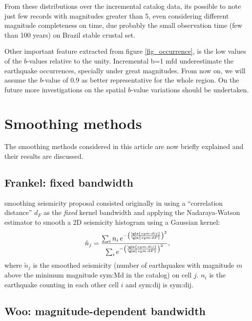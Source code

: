 \documentclass[draft, grl]{agutex}
\begin{document}
\begin{article}
From these distributions over the incremental catalog data, its possible to note just few records with magnitudes greater than 5, even considering different magnitude completeness on time, due probably the small observation time (few than 100 years) on Brazil stable crustal set.

Other important feature extracted from figure \ref{fig_occurrence}, is the low values of the $b$-values relative to the unity. Incremental b=1 \gls{mfd} underestimate the earthquake occurrences, specially under great magnitudes. From now on, we will assume the $b$-value of 0.9 as better representative for the whole region. On the future more investigations on the spatial $b$-value variations should be undertaken.

%
%
\section{Smoothing methods}
The smoothing methods considered in this article are now briefly explained and their results are discussed.

\subsection{Frankel: fixed bandwidth}

\citet{frankel_1995} smoothing seismicity proposal consisted originally in using a ``correlation distance'' $d_F$ as the \textit{fixed} kernel bandwidth and applying the Nadaraya-Watson \citep{nadaraya_1964, watson_1964} estimator to smooth a 2D seismicity histogram using a Gaussian kernel:
\begin{equation}
	\ensuremath{
		\tilde{n}_j = \frac{ \sum_{i} n_i \,e^{ - \left(\frac{\gls{sym:dij}}{\gls{sym:dF}}\right)^2}}
						   { \sum_{i}     e^{ - \left(\frac{\gls{sym:dij}}{\gls{sym:dF}}\right)^2}},
	}
	\label{eq:ni}
\end{equation}
where $\tilde{n}_j$ is the smoothed seismicity (number of earthquakes with magnitude $m$ above the minimum magnitude \gls{sym:Md} in the catalog) on cell $j$. $n_i$ is the earthquake counting in each other cell $i$ and \gls{sym:dij} is \glsdesc{sym:dij}.



\subsection{Woo: magnitude-dependent bandwidth}


\end{article}
\end{document}
